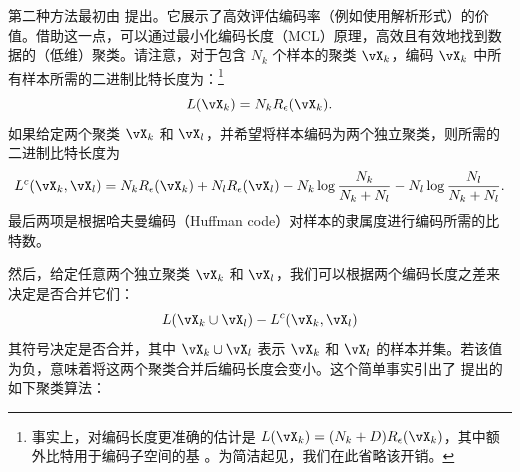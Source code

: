 \documentclass[../../book-main_zh.tex]{subfiles}
\begin{document}
第二种方法最初由 \cite{ma2007segmentation} 提出。它展示了高效评估编码率（例如使用解析形式）的价值。借助这一点，可以通过最小化编码长度（MCL）原理，高效且有效地找到数据的（低维）聚类。请注意，对于包含 $N_k$ 个样本的聚类 $\vX_k$，编码 $\vX_k$ 中所有样本所需的二进制比特长度为：\footnote{事实上，对编码长度更准确的估计是 $L(\vX_k) = (N_k+D) R_\epsilon(\vX_k)$，其中额外比特用于编码子空间的基 \cite{ma2007segmentation}。为简洁起见，我们在此省略该开销。}
\begin{equation}
    L(\vX_k) = N_k R_\epsilon(\vX_k).
\end{equation}
如果给定两个聚类 $\vX_k$ 和 $\vX_l$，并希望将样本编码为两个独立聚类，则所需的二进制比特长度为
\begin{equation*}
    L^c(\vX_k, \vX_l) = N_k R_\epsilon(\vX_k) + N_l R_\epsilon(\vX_l) -
    N_k \log\frac{N_k}{N_k + N_l} - N_l \log\frac{N_l}{N_k + N_l}.
\end{equation*}
最后两项是根据哈夫曼编码（Huffman code）对样本的隶属度进行编码所需的比特数。

然后，给定任意两个独立聚类 $\vX_k$ 和 $\vX_l$，我们可以根据两个编码长度之差来决定是否合并它们：
\begin{equation}
    L(\vX_k \cup \vX_l) - L^c(\vX_k, \vX_l)
\end{equation}
其符号决定是否合并，其中 $\vX_k \cup \vX_l$ 表示 $\vX_k$ 和 $\vX_l$ 的样本并集。若该值为负，意味着将这两个聚类合并后编码长度会变小。这个简单事实引出了 \cite{ma2007segmentation} 提出的如下聚类算法：
\begin{algorithm}[!htbp]
    \caption{编码长度的成对最速下降法}\label{alg:steepest_descent_coding_length}
    \begin{algorithmic}[1]

         
        \State{\Return{\(\cC\)}} 
        \Else
         
         
        \EndIf
        \EndWhile
        \State{\Return{\(\cC\)}}  
        \EndProcedure
    \end{algorithmic}
\end{algorithm}
\end{document}

